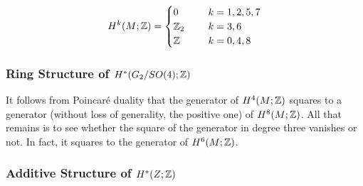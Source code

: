 \documentclass{scrartcl}
\begin{document}
\begin{equation*}
	H^k(M;\mathbb{Z})= 
	\begin{cases}
		0\qquad &k=1,2,5,7 \\
		\mathbb{Z}_2 &k=3,6\\
		\mathbb{Z} &k=0,4,8
	\end{cases}
\end{equation*}

\subsubsection{Ring Structure of \texorpdfstring{$H^*(G_2/SO(4);\mathbb{Z})$}{the Integral Cohomology of G2 over SO(4)}}

It follows from Poincar\'e duality that the generator of $H^4(M;\mathbb{Z})$ squares to a generator (without loss of generality, the positive one) of $H^8(M;\mathbb{Z})$. All that remains is to see whether the square of the generator in degree three vanishes or not.
In fact, it squares to the generator of $H^6(M;\mathbb{Z})$.

\subsubsection{Additive Structure of \texorpdfstring{$H^*(Z;\mathbb{Z})$}{the Integral Cohomology of Z}}
\end{document}
